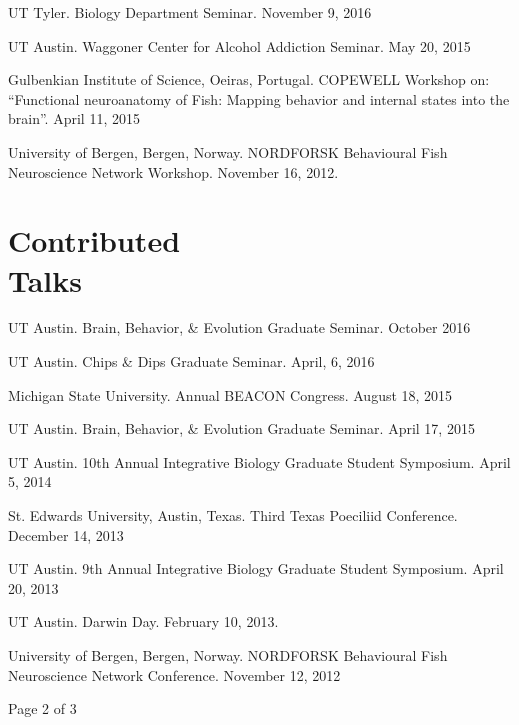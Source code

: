 \documentclass[margin,line]{resume}
\begin{document}
\begin{resume}
\begin{list1}
\item[] UT Tyler. Biology Department Seminar. November 9, 2016
\item[] UT Austin. Waggoner Center for Alcohol Addiction Seminar. May 20, 2015
\item[] Gulbenkian Institute of Science, Oeiras, Portugal. COPEWELL Workshop on: “Functional neuroanatomy of Fish: Mapping behavior and internal states into the brain”. April 11, 2015
\item[] University of Bergen, Bergen, Norway. NORDFORSK Behavioural Fish Neuroscience Network Workshop. November 16, 2012.
\end{list1}



\section{\mysidestyle Contributed\\Talks}

\begin{list1}

\item[]UT Austin. Brain, Behavior, \& Evolution Graduate Seminar. October 2016
\item[]UT Austin. Chips \& Dips Graduate Seminar. April, 6, 2016
\item[]Michigan State University. Annual BEACON Congress. August 18, 2015 
\item[]UT Austin. Brain, Behavior, \& Evolution Graduate Seminar. April 17, 2015
\item[]UT Austin. 10th Annual Integrative Biology Graduate Student Symposium. April 5, 2014
\item[]St. Edwards University, Austin, Texas. Third Texas Poeciliid Conference. December 14, 2013 
\item[]UT Austin. 9th Annual Integrative Biology Graduate Student Symposium. April 20, 2013
\item[]UT Austin. Darwin Day. February 10, 2013.
\item[]University of Bergen, Bergen, Norway. NORDFORSK Behavioural Fish Neuroscience Network Conference.  November 12, 2012

\end{list1}


\vspace{2cm}
{\centerline {Page 2 of 3}}
\newpage



\end{resume}
\end{document}
